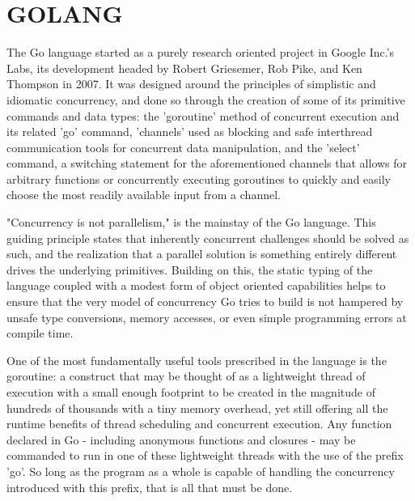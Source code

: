 \documentclass[report]{IEEEtran}
\begin{document}
%





\section{GOLANG}

The Go language started as a purely research oriented project in Google Inc.'s Labs, its development headed by Robert Griesemer, Rob Pike, and Ken Thompson in 2007. \cite{FAQ} It was designed around the principles of simplistic and idiomatic concurrency, and done so through the creation of some of its primitive commands and data types: the 'goroutine' method of concurrent execution and its related 'go' command, 'channels' used as blocking and safe interthread communication tools for concurrent data manipulation, and the 'select' command, a switching statement for the aforementioned channels that allows for arbitrary functions or concurrently executing goroutines to quickly and easily choose the most readily available input from a channel.

"Concurrency is not parallelism," \cite{FAQ} is the mainstay of the Go language. This guiding principle states that inherently concurrent challenges should be solved as such, and the realization that a parallel solution is something entirely different drives the underlying primitives. Building on this, the static typing of the language coupled with a modest form of object oriented capabilities helps to ensure that the very model of concurrency Go tries to build is not hampered by unsafe type conversions, memory accesses, or even simple programming errors at compile time.

One of the most fundamentally useful tools prescribed in the language is the goroutine: a construct that may be thought of as a lightweight thread of execution with a small enough footprint to be created in the magnitude of hundreds of thousands with a tiny memory overhead, yet still offering all the runtime benefits of thread scheduling and concurrent execution. Any function declared in Go - including anonymous functions and closures - may be commanded to run in one of these lightweight threads with the use of the prefix 'go'. So long as the program as a whole is capable of handling the concurrency introduced with this prefix, that is all that must be done.
\end{document}
